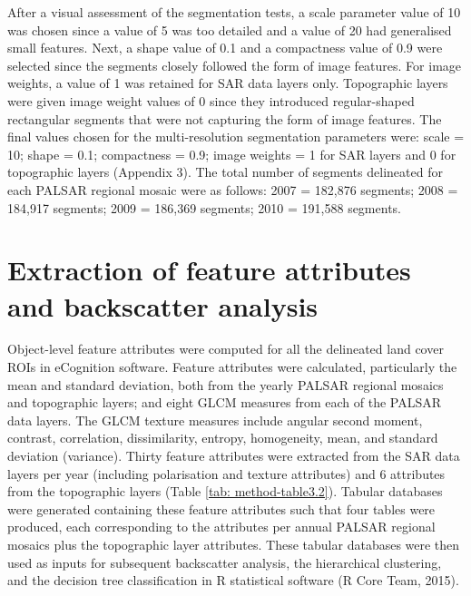 After a visual assessment of the segmentation tests, a scale parameter value of 10 was chosen since a value of 5 was too detailed and a value of 20 had generalised small features. Next, a shape value of 0.1 and a compactness value of 0.9 were selected since the segments closely followed the form of image features. For image weights, a value of 1 was retained for SAR data layers only. Topographic layers were given image weight values of 0 since they introduced regular-shaped rectangular segments that were not capturing the form of image features. The final values chosen for the multi-resolution segmentation parameters were: scale = 10; shape = 0.1; compactness = 0.9; image weights = 1 for SAR layers and 0 for topographic layers (Appendix 3). The total number of segments delineated for each PALSAR regional mosaic were as follows: 2007 = 182,876 segments; 2008 = 184,917 segments; 2009 = 186,369 segments; 2010 = 191,588 segments.

\section{Extraction of feature attributes and backscatter analysis}
\label{sec: method-feature-extraction}

Object-level feature attributes were computed for all the delineated land cover ROIs in eCognition software. Feature attributes were calculated, particularly the mean and standard deviation, both from the yearly PALSAR regional mosaics and topographic layers; and eight GLCM measures from each of the PALSAR data layers. The GLCM texture measures include angular second moment, contrast, correlation, dissimilarity, entropy, homogeneity, mean, and standard deviation (variance). Thirty feature attributes were extracted from the SAR data layers per year (including polarisation and texture attributes) and 6 attributes from the topographic layers (Table \ref{tab: method-table3.2}). Tabular databases were generated containing these feature attributes such that four tables were produced, each corresponding to the attributes per annual PALSAR regional mosaics plus the topographic layer attributes. These tabular databases were then used as inputs for subsequent backscatter analysis, the hierarchical clustering, and the decision tree classification in R statistical software (R Core Team, 2015).\\

